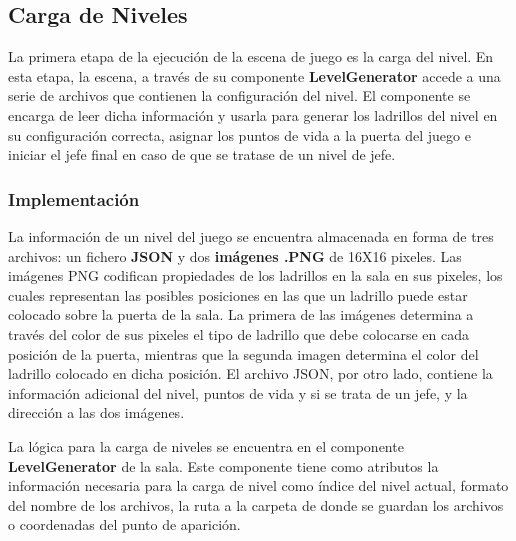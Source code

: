 \subsection{Carga de Niveles}
La primera etapa de la ejecución de la escena de juego es la carga del nivel. En esta etapa, la escena, a través de su componente \textbf{LevelGenerator} accede a una serie de archivos que contienen la configuración del nivel. El componente se encarga de leer dicha información y usarla para generar los ladrillos del nivel en su configuración correcta, asignar los puntos de vida a la puerta del juego e iniciar el jefe final en caso de que se tratase de un nivel de jefe.

\subsubsection{Implementación}
La información de un nivel del juego se encuentra almacenada en forma de tres archivos: un fichero \textbf{JSON} y dos \textbf{imágenes .PNG} de 16X16 pixeles. Las imágenes PNG codifican propiedades de los ladrillos en la sala en sus pixeles, los cuales representan las posibles posiciones en las que un ladrillo puede estar colocado sobre la puerta de la sala. La primera de las imágenes determina a través del color de sus pixeles el tipo de ladrillo que debe colocarse en cada posición de la puerta, mientras que la segunda imagen determina el color del ladrillo colocado en dicha posición.
El archivo JSON, por otro lado, contiene la información adicional del nivel, puntos de vida y si se trata de un jefe, y la dirección a las dos imágenes. 

La lógica para la carga de niveles se encuentra en el componente \textbf{LevelGenerator} de la sala. Este componente tiene como atributos la información necesaria para la carga de nivel como índice del nivel actual, formato del nombre de los archivos, la ruta a la carpeta de donde se guardan los archivos o coordenadas del punto de aparición. 


